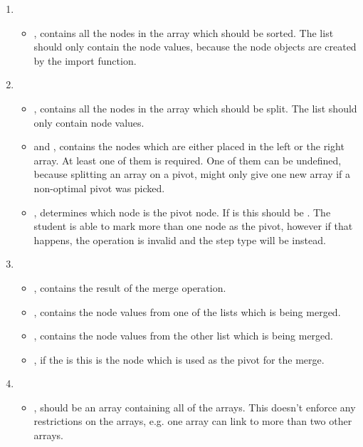 \begin{enumerate}
    \item {}
    \begin{itemize}
        \item {}, contains all the nodes in the array which should be sorted. The list should only contain the node values, because the node objects are created by the import function.
    \end{itemize}
    \item {}
    \begin{itemize}
        \item {}, contains all the nodes in the array which should be split. The list should only contain node values.
        \item {} and , contains the nodes which are either placed in the left or the right array. At least one of them is required. One of them can be undefined, because splitting an array on a pivot, might only give one new array if a non-optimal pivot was picked.
        \item {}, determines which node is the pivot node. If  is  this should be . The student is able to mark more than one node as the pivot, however if that happens, the operation is invalid and the step type will be  instead.
    \end{itemize}
    \item {}
    \begin{itemize}
        \item {}, contains the result of the merge operation. 
        \item {}, contains the node values from one of the lists which is being merged.
        \item {}, contains the node values from the other list which is being merged.
        \item {}, if the  is  this is the node which is used as the pivot for the merge. 
    \end{itemize}
    \item {}
    \begin{itemize}
        \item {}, should be an array containing all of the arrays. This doesn't enforce any restrictions on the arrays, e.g. one array can link to more than two other arrays.
    \end{itemize}
\end{enumerate}